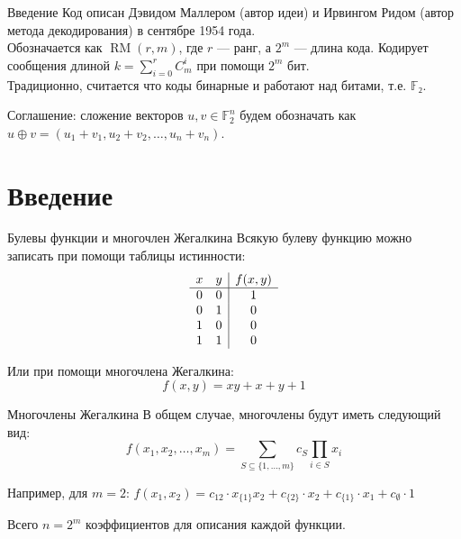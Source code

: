 \documentclass[beameroptions={aspectratio=169}]{beamerswitch}
\DeclareMathOperator{\RM}{RM}
\newcommand{\n}{\\}
\newcommand{\n}{ }
\begin{document}
\begin{frame}{Введение}
    Код описан Дэвидом Маллером (автор идеи) и Ирвингом Ридом (автор метода декодирования) в сентябре 1954 года.\n
    Обозначается как $\RM(r, m)$, где $r$ — ранг, а $2^m$ — длина кода. Кодирует сообщения длиной $k = \sum_{i=0}^{r} C_m^i$ при помощи $2^m$ бит. \n
    Традиционно, считается что коды бинарные и работают над битами, т.е. $𝔽₂$.
    
    Соглашение: сложение векторов $u, v ∈ 𝔽_2^n$ будем обозначать как $u ⊕ v = (u_1 + v_1, u_2 + v_2, …, u_n + v_n)$.
\end{frame}

\section{Введение}
\begin{frame}{Булевы функции и многочлен Жегалкина}
    Всякую булеву функцию можно записать при помощи таблицы истинности:
    \[
        \begin{array}{cc | c}
            x & y & f(x, y) \\\hline
            0 & 0 & 1 \\
            0 & 1 & 0 \\
            1 & 0 & 0 \\
            1 & 1 & 0
        \end{array}
    \]

    Или при помощи многочлена Жегалкина:
    \[
        f(x, y) = xy + x + y + 1
    \]
\end{frame}

\begin{frame}{Многочлены Жегалкина}
    В общем случае, многочлены будут иметь следующий вид:
    \[
        f(x_1, x_2, …, x_m) = \sum_{S ⊆ \{1, …, m\}} c_S \prod_{i ∈ S} x_i
    \]

    Например, для $m = 2$: $ f(x_1, x_2) = c_{12} \cdot x_{\{1\}}x_2 + c_{\{2\}} \cdot x_2 + c_{\{1\}} \cdot x_1 + c_{\emptyset} \cdot 1$
    
    Всего $n = 2^m$ коэффициентов для описания каждой функции.
\end{frame}
\end{document}
